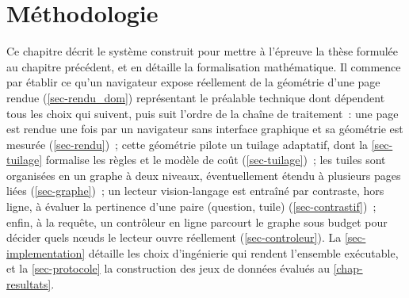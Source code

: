 \chapter{Méthodologie}
\label{chap-methodologie}

Ce chapitre décrit le système construit pour mettre à l'épreuve la thèse formulée
au chapitre précédent, et en détaille la formalisation mathématique. Il commence
par établir ce qu'un navigateur expose réellement de la géométrie d'une page
rendue (\cref{sec-rendu_dom}) représentant le préalable technique dont dépendent tous les
choix qui suivent, puis suit l'ordre de la chaîne de traitement~: une page est
rendue une fois par un navigateur sans interface graphique et sa géométrie est
mesurée (\cref{sec-rendu})~; cette géométrie pilote un tuilage adaptatif, dont
la \cref{sec-tuilage} formalise les règles et le modèle de coût
(\cref{sec-tuilage})~; les tuiles sont organisées en un graphe à deux niveaux,
éventuellement étendu à plusieurs pages liées (\cref{sec-graphe})~; un lecteur
vision-langage est entraîné par contraste, hors ligne, à évaluer la pertinence
d'une paire (question, tuile) (\cref{sec-contrastif})~; enfin, à la requête, un
contrôleur en ligne parcourt le graphe sous budget pour décider quels nœuds le
lecteur ouvre réellement (\cref{sec-controleur}). La \cref{sec-implementation}
détaille les choix d'ingénierie qui rendent l'ensemble exécutable, et la
\cref{sec-protocole} la construction des jeux de données évalués au
\cref{chap-resultats}.


